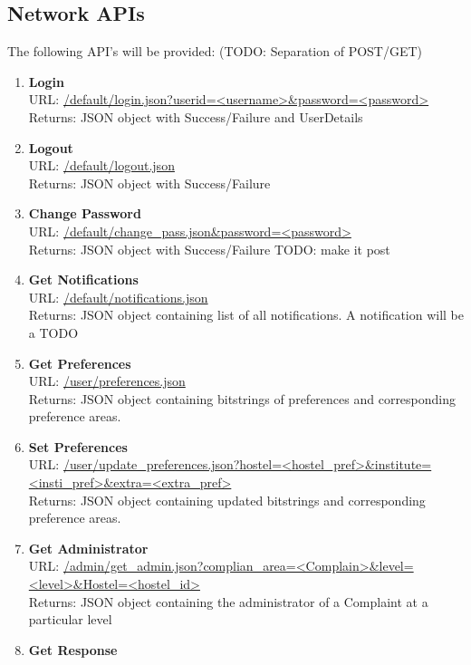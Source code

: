 \documentclass{article}
\begin{document}
			\subsection{Network APIs}
				The following API's will be provided:
				(TODO: Separation of POST/GET)
				\begin{enumerate}
					\item \textbf{Login} \\
						URL: \url{/default/login.json?userid=<username>&password=<password>}  \\
						Returns: JSON object with Success/Failure and UserDetails
					\item \textbf{Logout} \\
						URL: \url{/default/logout.json} \\
						Returns: JSON object with Success/Failure
					\item \textbf{Change Password} \\
						URL: \url{/default/change_pass.json&password=<password>} \\
						Returns: JSON object with Success/Failure TODO: make it post	
					\item \textbf{Get Notifications} \\
						URL: \url{/default/notifications.json} \\
						Returns: JSON object containing list of all notifications. 
						A notification will be a TODO 
					\item \textbf{Get Preferences} \\
						URL: \url{/user/preferences.json} \\
						Returns: JSON object containing bitstrings of preferences and corresponding preference areas.
					\item \textbf{Set Preferences} \\
						URL: \url{/user/update_preferences.json?hostel=<hostel_pref>&institute=<insti_pref>&extra=<extra_pref>} \\
						Returns:  JSON object containing updated bitstrings and corresponding preference areas.
					\item \textbf{Get Administrator} \\
						URL: \url{/admin/get_admin.json?complian_area=<Complain>&level=<level>&Hostel=<hostel_id>}\\
						Returns:  JSON object containing  the administrator of a Complaint at a particular level
					\item \textbf{Get Response} \\

\end{enumerate}
\end{document}
